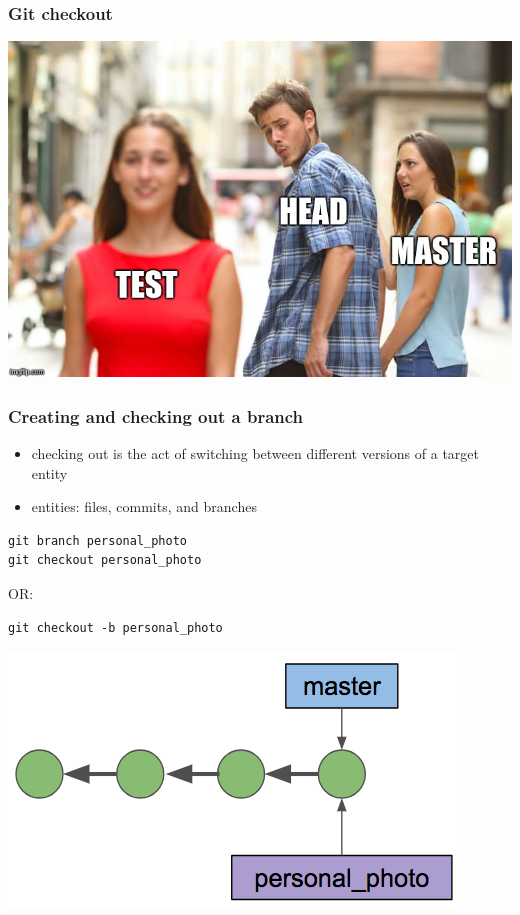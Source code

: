 \documentclass[12pt]{beamer}
\begin{document}
\begin{frame}
\frametitle{Git checkout}
\begin{center}
	\includegraphics[width=0.6\linewidth]{checkout_meme}
\end{center}
\end{frame}

\begin{frame}[fragile]
\frametitle{Creating and checking out a branch}
\begin{itemize}
	\item checking out is the act of switching between different versions of a target entity
	\item entities: files, commits, and branches
\end{itemize}
\begin{verbatim}
git branch personal_photo
git checkout personal_photo
\end{verbatim}
OR:
\begin{verbatim}
git checkout -b personal_photo
\end{verbatim}
\begin{center}
	\includegraphics[width=0.55\linewidth]{branch_diagram}
\end{center}
\end{frame}
\end{document}
